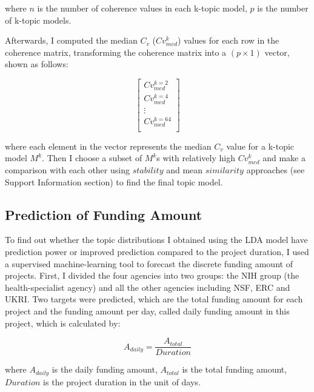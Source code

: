 where $n$ is the number of coherence values in each k-topic model, $p$ is the number of k-topic models.

Afterwards, I computed the median $C_v$ ($Cv_{med}^{k}$) values for each row in the coherence matrix, transforming the coherence matrix into a $(p \times 1)$ vector, shown as follows:

\begin{equation}
  \begin{bmatrix}
  Cv_{med}^{k = 2} \\
  Cv_{med}^{k = 4} \\
  \vdots \\
  Cv_{med}^{k = 64} \\
  \end{bmatrix}
\end{equation}

where each element in the vector represents the median $C_v$ value for a k-topic model $M^k$. Then I choose a subset of $M^k$s with relatively high $Cv_{med}^{k}$ and make a comparison with each other using $stability$ and mean $similarity$ approaches (see Support Information section) to find the final topic model.

\subsection{Prediction of Funding Amount}

To find out whether the topic distributions I obtained using the LDA model have prediction power or improved prediction compared to the project duration, I used a supervised machine-learning tool to forecast the discrete funding amount of projects. First, I divided the four agencies into two groups: the NIH group (the health-specialist agency) and all the other agencies including NSF, ERC and UKRI. Two targets were predicted, which are the total funding amount for each project and the funding amount per day, called daily funding amount in this project, which is calculated by:

\begin{equation}
  A_{daily} = \frac{A_{total}}{Duration}
\end{equation}

where $A_{daily}$ is the daily funding amount, $A_{total}$ is the total funding amount, $Duration$ is the project duration in the unit of days.

